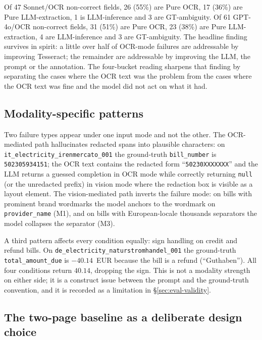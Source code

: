 Of 47 Sonnet/OCR non-correct fields, 26 (55\%) are Pure OCR, 17
(36\%) are Pure LLM-extraction, 1 is LLM-inference and 3 are
GT-ambiguity. Of 61 GPT-4o/OCR non-correct fields, 31 (51\%) are
Pure OCR, 23 (38\%) are Pure LLM-extraction, 4 are LLM-inference
and 3 are GT-ambiguity. The headline finding survives in spirit: a
little over half of OCR-mode failures are addressable by improving
Tesseract; the remainder are addressable by improving the LLM, the
prompt or the annotation. The four-bucket reading sharpens that
finding by separating the cases where the OCR text was the problem
from the cases where the OCR text was fine and the model did not
act on what it had.

\subsection{Modality-specific patterns}
\label{sec:eval-failures-modality}

Two failure types appear under one input mode and not the other.
The OCR-mediated path hallucinates redacted spans into plausible
characters: on
\texttt{it\_electricity\_irenmercato\_001} the ground-truth
\texttt{bill\_number} is \texttt{502305934151}; the OCR text
contains the redacted form ``\texttt{50230XXXXXXX}'' and the LLM
returns a guessed completion in OCR mode while correctly returning
\texttt{null} (or the unredacted prefix) in vision mode where the
redaction box is visible as a layout element. The vision-mediated
path inverts the failure mode: on bills with prominent brand
wordmarks the model anchors to the wordmark on
\texttt{provider\_name} (M1), and on bills with European-locale
thousands separators the model collapses the separator (M3).

A third pattern affects every condition equally: sign handling on
credit and refund bills. On \texttt{de\_electricity\_naturstromhandel\_001}
the ground-truth \texttt{total\_amount\_due} is $-40.14$~EUR
because the bill is a refund (``Guthaben''). All four conditions
return $40.14$, dropping the sign. This is not a modality
strength on either side; it is a construct issue between the prompt
and the ground-truth convention, and it is recorded as a
limitation in \S\ref{sec:eval-validity}.

\subsection{The two-page baseline as a deliberate design choice}
\label{sec:eval-failures-pagecap}

